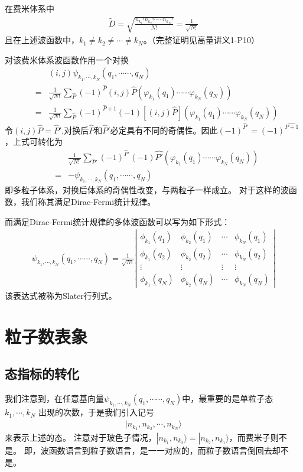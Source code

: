 \documentclass[12pt, a4paper, oneside, UTF8]{ctexbook}
\begin{document}
在费米体系中
\begin{eqnarray}
    \tilde{D}=\sqrt{\frac{n_{k_1}!n_{k_2}!\cdots\cdots n_{k_N}!}{N!}}=\frac{1}{\sqrt{N!}} 
\end{eqnarray}
且在上述波函数中，$k_1\neq k_2\neq \cdots \neq k_N$。（完整证明见高量讲义1-P10）

对该费米体系波函数作用一个对换
\begin{eqnarray}
    &&(i,j)\psi_{k_1,\cdots,k_N}(q_1,\cdots\cdots,q_N)\\\nonumber
    &=&\frac{1}{\sqrt{N!}}\sum_{\hat{P}}(-1)^{\hat{P}}(i,j)\hat{P}(\varphi_{k_1}(q_1)\cdots\cdots\varphi_{k_N}(q_N))\\\nonumber
    &=&\frac{1}{\sqrt{N!}}\sum_{\hat{P}}(-1)^{\hat{P}+1}(-1)[(i,j)\hat{P}](\varphi_{k_1}(q_1)\cdots\cdots\varphi_{k_N}(q_N))
\end{eqnarray}
令$(i,j)\hat{P}=\hat{P}'$,对换后$\hat{P}$和$\hat{P}'$必定具有不同的奇偶性。因此$(-1)^{\hat{P}'}=(-1)^{\hat{P+1}}$，上式可转化为
\begin{eqnarray}
    &&\frac{1}{\sqrt{N!}}\sum_{\hat{P}'}(-1)^{\hat{P}'}(-1)\hat{P'}(\varphi_{k_1}(q_1)\cdots\cdots\varphi_{k_N}(q_N))\\\nonumber
    &=&-\psi_{k_1,\cdots,k_N}(q_1,\cdots\cdots,q_N)
\end{eqnarray}
即多粒子体系，对换后体系的奇偶性改变，与两粒子一样成立。
对于这样的波函数，我们称其满足Dirac-Fermi统计规律。

而满足Dirac-Fermi统计规律的多体波函数可以写为如下形式：
\begin{align}
    \psi_{k_1,\cdots,k_N}(q_1,\cdots\cdots,q_N)=\frac{1}{\sqrt{N!}}\left|\begin{matrix}
        \phi_{k_1}(q_1)&\phi_{k_2}(q_1)&\cdots &\phi_{k_N}(q_1)\\
        \phi_{k_1}(q_2)&\phi_{k_2}(q_2)&\cdots &\phi_{k_N}(q_2)\\
        \vdots &\vdots&\vdots&\vdots\\
        \phi_{k_1}(q_N)&\phi_{k_2}(q_N)&\cdots &\phi_{k_N}(q_N)
    \end{matrix}\right|
\end{align}
该表达式被称为Slater行列式。

\section{粒子数表象}
\subsection{态指标的转化}
我们注意到，在任意基向量$\psi_{k_1,\cdots,k_N}(q_1,\cdots\cdots,q_N)$中，最重要的是单粒子态$k_1,\cdots,k_N$
出现的次数，于是我们引入记号
\begin{align}
    |n_{k_1},n_{k_2},\cdots,n_{k_N}\rangle
\end{align}
来表示上述的态。
注意对于玻色子情况，$|n_{k_1},n_{k_2}\rangle=|n_{k_2},n_{k_1}\rangle$，而费米子则不是。
即，波函数语言到粒子数语言，是一一对应的，而粒子数语言倒回去却不是。
\end{document}
